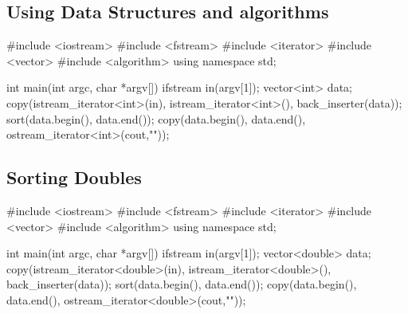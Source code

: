 
\begin{slide}
\section{Using Data Structures and algorithms}
\pausebuild
\begin{cpp}
#include <iostream>
#include <fstream>
#include <iterator>
#include <vector>
#include <algorithm>
using namespace std;

int main(int argc, char *argv[])
{
  ifstream in(argv[1]);
  vector<int> data;
  copy(istream_iterator<int>(in), istream_iterator<int>(), 
       back_inserter(data));
  sort(data.begin(), data.end());
  copy(data.begin(), data.end(), ostream_iterator<int>(cout,"\n"));
}
\end{cpp}\pause\vspace{-0.5cm}
\end{slide}


\begin{slide}
\section{Sorting Doubles}
\pausebuild
\begin{cpp}
#include <iostream>
#include <fstream>
#include <iterator>
#include <vector>
#include <algorithm>
using namespace std;

int main(int argc, char *argv[])
{
  ifstream in(argv[1]);
  vector<double> data;
  copy(istream_iterator<double>(in), istream_iterator<double>(), 
       back_inserter(data));
  sort(data.begin(), data.end());
  copy(data.begin(), data.end(), ostream_iterator<double>(cout,"\n"));
}
\end{cpp}\pause\vspace{-0.5cm}
\end{slide}



